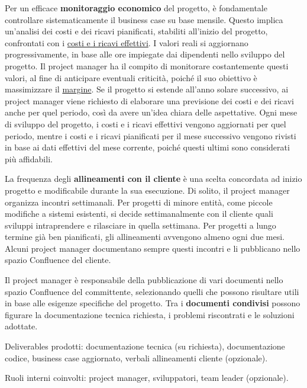         Per un efficace \textbf{monitoraggio economico} del progetto, è fondamentale controllare sistematicamente il business case su base mensile.
        Questo implica un'analisi dei costi e dei ricavi pianificati, stabiliti all'inizio del progetto, confrontati con i \underline{costi e i ricavi effettivi}.
        I valori reali si aggiornano progressivamente, in base alle ore impiegate dai dipendenti nello sviluppo del progetto. 
        Il project manager ha il compito di monitorare costantemente questi valori, al fine di anticipare eventuali criticità, poiché il suo
        obiettivo è massimizzare il \underline{margine}. Se il progetto si estende all'anno solare successivo, ai project manager viene richiesto di elaborare una previsione
        dei costi e dei ricavi anche per quel periodo, così da avere un'idea chiara delle aspettative. 
        Ogni mese di sviluppo del progetto, i costi e i ricavi effettivi vengono aggiornati per quel periodo, mentre i costi e i ricavi pianificati per il mese successivo
        vengono rivisti in base ai dati effettivi del mese corrente, poiché questi ultimi sono considerati più affidabili.

        La frequenza degli \textbf{allineamenti con il cliente} è una scelta concordata ad inizio progetto e modificabile durante la sua esecuzione. Di solito,
        il project manager organizza incontri settimanali. Per progetti di minore entità, come piccole modifiche a sistemi esistenti, si decide
        settimanalmente con il cliente quali sviluppi intraprendere e rilasciare in quella settimana. Per progetti a lungo termine già ben pianificati, gli
        allineamenti avvengono almeno ogni due mesi. Alcuni project manager documentano sempre questi incontri e li pubblicano nello spazio Confluence del cliente.

        Il project manager è responsabile della pubblicazione di vari documenti nello spazio Confluence del committente, selezionando quelli che possono risultare
        utili in base alle esigenze specifiche del progetto. Tra i \textbf{documenti condivisi} possono figurare la documentazione tecnica richiesta, i problemi riscontrati e le soluzioni adottate.

        Deliverables prodotti: documentazione tecnica (su richiesta), documentazione codice, business case aggiornato, verbali allineamenti cliente (opzionale).

        Ruoli interni coinvolti: project manager, sviluppatori, team leader (opzionale).

